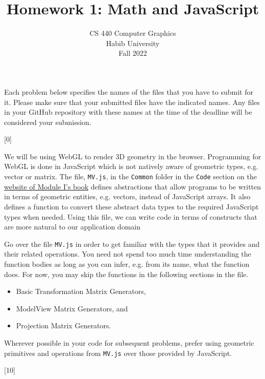\documentclass[addpoints]{exam}
\title{Homework 1: Math and JavaScript}
\author{CS 440 Computer Graphics\\Habib University\\Fall 2022}
\date{}
\begin{document}
\maketitle

Each problem below specifies the names of the files that you have to submit for it. Please make sure that your submitted files have the indicated names. Any files in your GitHub repository with these names at the time of the deadline will be considered your submission.

\begin{questions}

  [0]

  We will be using WebGL to render 3D geometry in the browser. Programming for WebGL is done in JavaScript which is not natively aware of geometric types, e.g. vector or matrix. The file, \texttt{MV.js}, in the \texttt{Common} folder in the \texttt{Code} section on the \href{https://www.cs.unm.edu/~angel/BOOK/INTERACTIVE_COMPUTER_GRAPHICS/SEVENTH_EDITION/}{website of Module I's book} defines abstractions that allow programs to be written in terms of geometric entities, e.g. vectors, instead of JavaScript arrays. It also defines a function to convert these abstract data types to the required JavaScript types when needed. Using this file, we can write code in terms of constructs that are more natural to our application domain

  Go over the file {\tt MV.js} in order to get familiar with the types that it provides and their related operations. You need not spend too much time understanding the function bodies as long as you can infer, e.g. from its name, what the function does. For now, you may skip the functions in the following sections in the file.
  \begin{itemize}
  \item Basic Transformation Matrix Generators, 
  \item ModelView Matrix Generators, and
  \item Projection Matrix Generators.
  \end{itemize}

  Wherever possible in your code for subsequent problems, prefer using geometric primitives and operations from {\tt MV.js} over those provided by JavaScript.
  
  [10]


\end{questions}
\end{document}
